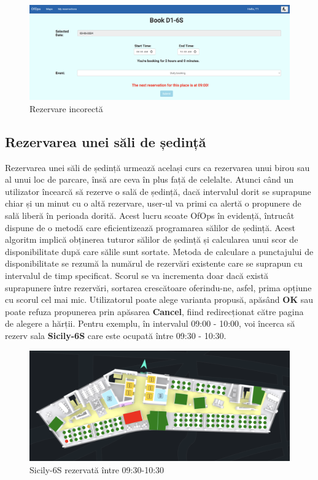 \begin{figure}[!htb]
    \centering
    \includegraphics[width=0.9\linewidth]{images/rezerv incorect.png}
    \caption{Rezervare incorectă}
    \label{fig:rezerv incorect}
\end{figure}

\subsection{Rezervarea unei săli de ședință}

Rezervarea unei săli de ședință urmează același curs ca rezervarea unui birou sau al unui loc de parcare, însă are ceva în plus față de celelalte. Atunci când un utilizator încearcă să rezerve o sală de ședință, dacă intervalul dorit se suprapune chiar și un minut cu o altă rezervare, user-ul va primi ca alertă o propunere de sală liberă în perioada dorită. Acest lucru scoate OfOps în evidență, întrucât dispune de o metodă care eficientizează programarea sălilor de ședință. Acest algoritm implică obținerea tuturor sălilor de ședință și calcularea unui scor de disponibilitate după care sălile sunt sortate. Metoda de calculare a punctajului de disponibilitate se rezumă la numărul de rezervări existente care se suprapun cu intervalul de timp specificat. Scorul se va incrementa doar dacă există suprapunere între rezervări, sortarea crescătoare oferindu-ne, asfel, prima opțiune cu scorul cel mai mic. Utilizatorul poate alege varianta propusă, apăsând \textbf{OK} sau poate refuza propunerea prin apăsarea \textbf{Cancel}, fiind redirecționat către pagina de alegere a hărții. Pentru exemplu, în intervalul 09:00 - 10:00, voi încerca să rezerv sala \textbf{Sicily-6S} care este ocupată între 09:30 - 10:30.

\begin{figure}[!htb]
    \centering
    \includegraphics[width=0.9\linewidth]{images/sicily rezerv1.png}
    \caption{Sicily-6S rezervată între 09:30-10:30}
    \label{fig:sicily rezerv1.png}
\end{figure}

